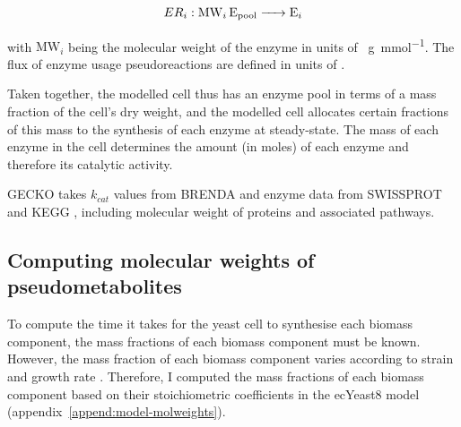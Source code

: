 \begin{equation}
  ER_{i}: \ce{ MW_{i} E_{\mathrm{pool}} -> E_{i} }
  \label{eq:model-gecko-enzyme-usage}
\end{equation}

with $\mathrm{MW}_{i}$ being the molecular weight of the enzyme in units of \SI{}{\gram~\milli\mole^{-1}}.
The flux of enzyme usage pseudoreactions are defined in units of \SI{}{\mmolgdw}.

Taken together, the modelled cell thus has an enzyme pool in terms of a mass fraction of the cell's dry weight, and the modelled cell allocates certain fractions of this mass to the synthesis of each enzyme at steady-state.  The mass of each enzyme in the cell determines the amount (in moles) of each enzyme and therefore its catalytic activity.

GECKO takes $k_{cat}$ values from BRENDA \parencite{changBRENDAELIXIRCore2021} and enzyme data from SWISSPROT \parencite{theuniprotconsortiumUniProtUniversalProtein2023} and KEGG \parencite{kanehisaKEGGTaxonomybasedAnalysis2023}, including molecular weight of proteins and associated pathways.

\subsection{Computing molecular weights of pseudometabolites}
\label{subsec:model-yeast8-molweights}

To compute the time it takes for the yeast cell to synthesise each biomass component, the mass fractions of each biomass component must be known.
However, the mass fraction of each biomass component varies according to strain and growth rate \parencite{nilssonMetabolicTradeoffsYeast2016, elsemmanWholecellModelingYeast2022}.
Therefore, I computed the mass fractions of each biomass component based on their stoichiometric coefficients in the ecYeast8 model (appendix~\ref{append:model-molweights}).

